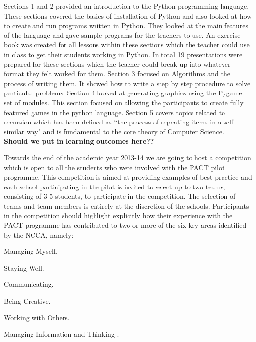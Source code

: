 \documentclass[a4paper]{article}
\begin{document}
Sections 1 and 2 provided an introduction to the Python programming language. These sections covered the basics of installation of Python and also looked at how to create and run programs written in Python. They looked at the main features of the language and gave sample programs for the teachers to use. An exercise book was created for all lessons within these sections which the teacher could use in class to get their students working in Python. In total 19 presentations were prepared for these sections which the teacher could break up into whatever format they felt worked for them. Section 3 focused on Algorithms and the process of writing them. It showed how to write a step by step procedure to solve particular problems. Section 4 looked at generating graphics using the Pygame set of modules. This section focused on allowing the participants to create fully featured games in the python language. Section 5 covers topics related to recursion which has been defined as ``the process of repeating items in a self-similar way" and is fundamental to the core theory of Computer Science. \\


\textbf{Should we put in learning outcomes here??}
\newline



Towards the end of the academic year 2013-14 we are going to host a competition which is open to all the students who were involved with the PACT pilot programme. This competition is aimed at providing examples of best practice and each school participating in the pilot is invited to select up to two teams, consisting of 3-5 students, to participate in the competition. The selection of teams and team members is entirely at the discretion of the schools. Participants in the competition should highlight explicitly how their experience with the PACT programme has contributed to two or more of the six key areas identified by the NCCA, namely:

\begin{compactenum}
  \item Managing Myself.
  \item Staying Well.
  \item Communicating.
  \item Being Creative.
  \item Working with Others.
  \item Managing Information and Thinking \cite{ncca2013}.
\end{compactenum}
\end{document}

